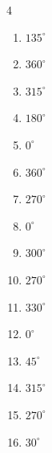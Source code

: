 \begin{multicols}{4}
\begin{enumerate}
  \item $\displaystyle 135^{\circ}$

  \item $\displaystyle 360^{\circ}$
        \phantom{$\displaystyle =2\pi$}

  \item $\displaystyle 315^{\circ}$

  \item $\displaystyle 180^{\circ}$
        \phantom{$\displaystyle =\pi$}

\columnbreak %

  \item $\displaystyle 0^{\circ}$
        \phantom{$\displaystyle =0$}

  \item $\displaystyle 360^{\circ}$
        \phantom{$\displaystyle =2\pi$}

  \item $\displaystyle 270^{\circ}$

  \item $\displaystyle 0^{\circ}$
        \phantom{$\displaystyle =0$}

  \item $\displaystyle 300^{\circ}$

  \item $\displaystyle 270^{\circ}$

  \item $\displaystyle 330^{\circ}$

  \item $\displaystyle 0^{\circ}$
        \phantom{$\displaystyle =0$}

  \item $\displaystyle 45^{\circ}$

  \item $\displaystyle 315^{\circ}$

  \item $\displaystyle 270^{\circ}$

  \item $\displaystyle 30^{\circ}$


\end{enumerate}
\end{multicols}
